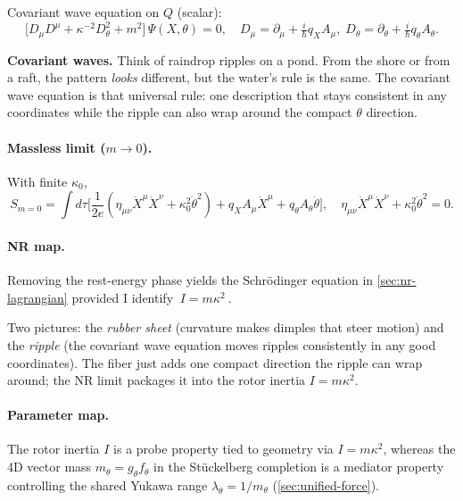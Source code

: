 Covariant wave equation on $Q$ (scalar):
\begin{equation}
 \big[D_\mu D^\mu + \kappa^{-2} D_\theta^2 + m^2\big]\,\Psi(X,\theta)=0,\quad D_\mu=\partial_\mu+\tfrac{i}{\hbar}q_XA_\mu,\; D_\theta=\partial_\theta+\tfrac{i}{\hbar}q_\theta A_\theta.
\end{equation}

  \begin{idea}
  	  	\textbf{Covariant waves.} Think of raindrop ripples on a pond. From the shore or from a raft, the pattern \emph{looks} different, but the water’s rule is the same. The covariant wave equation is that universal rule: one description that stays consistent in any coordinates while the ripple can also wrap around the compact $\theta$ direction.
  \end{idea}

\paragraph{Massless limit ($m\to 0$).} With finite $\kappa_0$,
\begin{equation}
 S_{m=0}=\int d\tau\Big[\frac{1}{2e}(\eta_{\mu\nu}\dot X^\mu\dot X^\nu+\kappa_0^2\dot\theta^2)+q_X A_\mu\dot X^\mu+q_\theta A_\theta\dot\theta\Big],\quad \eta_{\mu\nu}\dot X^\mu\dot X^\nu+\kappa_0^2\dot\theta^2=0.
\end{equation}

\paragraph{NR map.} Removing the rest-energy phase yields the Schr\"odinger equation in \cref{sec:nr-lagrangian} provided I identify $\boxed{\ I=m\kappa^2\ }$.

\begin{idea}
Two pictures: the \emph{rubber sheet} (curvature makes dimples that steer motion) and the \emph{ripple} (the covariant wave equation moves ripples consistently in any good coordinates). The fiber just adds one compact direction the ripple can wrap around; the NR limit packages it into the rotor inertia $I=m\kappa^2$.
\end{idea}

\paragraph{Parameter map.} The rotor inertia $I$ is a probe property tied to geometry via $I=m\kappa^2$, whereas the 4D vector mass $m_\theta=g_\theta f_\theta$ in the St\"uckelberg completion is a mediator property controlling the shared Yukawa range $\lambda_\theta=1/m_\theta$ (\cref{sec:unified-force}).

